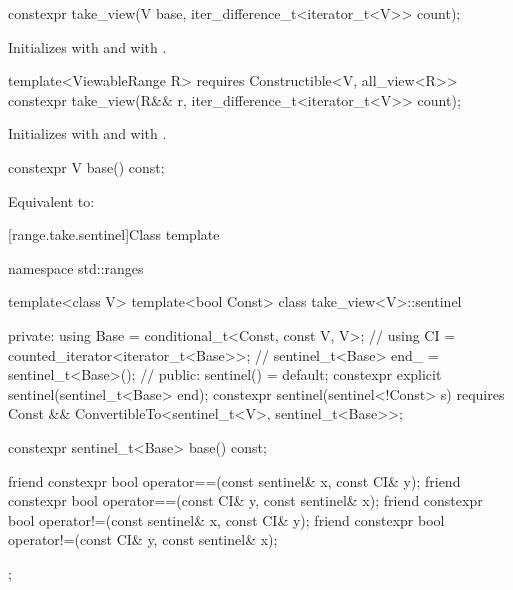 %
\begin{itemdecl}
constexpr take_view(V base, iter_difference_t<iterator_t<V>> count);
\end{itemdecl}

\begin{itemdescr}
\pnum
\effects Initializes  with  and
 with .
\end{itemdescr}

%
\begin{itemdecl}
template<ViewableRange R>
  requires Constructible<V, all_view<R>>
constexpr take_view(R&& r, iter_difference_t<iterator_t<V>> count);
\end{itemdecl}

\begin{itemdescr}
\pnum
\effects Initializes  with 
and  with .
\end{itemdescr}

%
\begin{itemdecl}
constexpr V base() const;
\end{itemdecl}

\begin{itemdescr}
\pnum
\effects Equivalent to: 
\end{itemdescr}

[range.take.sentinel]{Class template }

\begin{codeblock}
namespace std::ranges {
  template<class V>
  template<bool Const>
  class take_view<V>::sentinel {
  private:
    using Base = conditional_t<Const, const V, V>;      // \expos
    using CI = counted_iterator<iterator_t<Base>>;      // \expos
    sentinel_t<Base> end_ = sentinel_t<Base>();         // \expos
  public:
    sentinel() = default;
    constexpr explicit sentinel(sentinel_t<Base> end);
    constexpr sentinel(sentinel<!Const> s)
      requires Const && ConvertibleTo<sentinel_t<V>, sentinel_t<Base>>;

    constexpr sentinel_t<Base> base() const;

    friend constexpr bool operator==(const sentinel& x, const CI& y);
    friend constexpr bool operator==(const CI& y, const sentinel& x);
    friend constexpr bool operator!=(const sentinel& x, const CI& y);
    friend constexpr bool operator!=(const CI& y, const sentinel& x);
  };
}
\end{codeblock}

